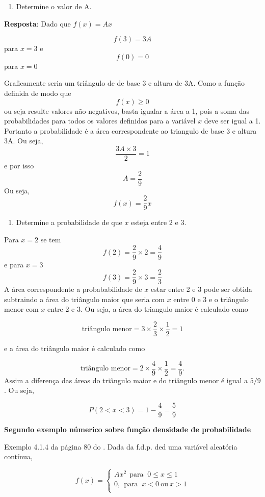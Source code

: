 \documentclass[
]{book}
\providecommand{\tightlist}{%
  \setlength{\itemsep}{0pt}\setlength{\parskip}{0pt}}
\begin{document}
\begin{enumerate}
\def\labelenumi{\alph{enumi})}
\tightlist
\item
  Determine o valor de A.
\end{enumerate}

\textbf{Resposta}: Dado que \(f(x) = Ax\)

\[
  f(3) = 3A
\]
para \(x = 3\) e
\[
  f(0)  = 0
\]
para \(x=0\)

Graficamente seria um triângulo de de base 3 e altura de 3A. Como a função definida de modo que
\[
  f(x) \geq 0
\]
ou seja resulte valores não-negativos, basta igualar a área a 1, pois a soma das probabilidades para todos os valores definidos para a variável \(x\) deve ser igual a 1. Portanto a probabilidade é a área correspondente ao triangulo de base 3 e altura 3A. Ou seja,
\[
  \dfrac{3A \times 3}{2} = 1
\]
e
por isso
\[
  A = \dfrac{2}{9}
\]
Ou seja,
\[
  f(x) = \dfrac{2}{9} x
\]

\begin{enumerate}
\def\labelenumi{\alph{enumi})}
\setcounter{enumi}{1}
\tightlist
\item
  Determine a probabilidade de que \(x\) esteja entre 2 e 3.
\end{enumerate}

Para \(x=2\) se tem
\[
  f(2) = \dfrac{2}{9}\times 2 = \dfrac{4}{9}
\]
e para \(x=3\)
\[
f(3) = \dfrac{2}{9} \times 3 = \dfrac{2}{3}
\]
A área correspondente a probababilidade de \(x\) estar entre 2 e 3 pode ser obtida subtraindo a área do triângulo maior que seria com \(x\) entre 0 e 3 e o triângulo menor com \(x\) entre 2 e 3. Ou seja, a área do triangulo maior é calculado como

\[
  \text{triângulo menor} = 3\times \dfrac{2}{3} \times \dfrac{1}{2} = 1
\]

e a área do triângulo maior é calculado como

\[
  \text{triângulo menor} = 2\times \dfrac{4}{9} \times \dfrac{1}{2} = \dfrac{4}{9}.
\]
Assim a diferença das áreas do triângulo maior e do triângulo menor é igual a \(5/9\). Ou seja,

\[
  P(2<x<3) = 1 - \dfrac{4}{9} = \dfrac{5}{9}
\]

\textbf{Segundo exemplo númerico sobre função densidade de probabilidade}

Exemplo 4.1.4 da página 80 do \citet{Sartoris2013}. Dada da f.d.p. ded uma variável aleatória contínua,

\[
  f(x) = 
    \begin{cases}
      Ax^2~~\text{para }~0\leq x \leq 1\\
      0,~~\text{para }~x<0~\text{ou}~x>1\\
    \end{cases}
  \]
\end{document}
